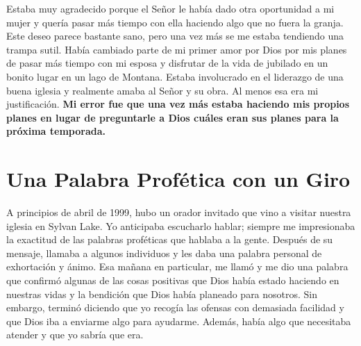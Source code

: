 \documentclass[twoside, 12pt]{book}
\begin{document}
Estaba muy agradecido porque el Señor le había dado otra oportunidad a mi mujer y quería pasar más tiempo con ella haciendo algo que no fuera la granja. Este deseo parece bastante sano, pero una vez más se me estaba tendiendo una trampa sutil. Había cambiado parte de mi primer amor por Dios por mis planes de pasar más tiempo con mi esposa y disfrutar de la vida de jubilado en un bonito lugar en un lago de Montana. Estaba involucrado en el liderazgo de una buena iglesia y realmente amaba al Señor y su obra. Al menos esa era mi justificación. \textbf{Mi error fue que una vez más estaba haciendo mis propios planes en lugar de preguntarle a Dios cuáles eran sus planes para la próxima temporada.}\\

\section{Una Palabra Profética con un Giro}

A principios de abril de 1999, hubo un orador invitado que vino a visitar nuestra iglesia en Sylvan Lake. Yo anticipaba escucharlo hablar; siempre me impresionaba la exactitud de las palabras proféticas que hablaba a la gente. Después de su mensaje, llamaba a algunos individuos y les daba una palabra personal de exhortación y ánimo. Esa mañana en particular, me llamó y me dio una palabra que confirmó algunas de las cosas positivas que Dios había estado haciendo en nuestras vidas y la bendición que Dios había planeado para nosotros. Sin embargo, terminó diciendo que yo recogía las ofensas con demasiada facilidad y que Dios iba a enviarme algo para ayudarme. Además, había algo que necesitaba atender y que yo sabría que era.\\
\end{document}
